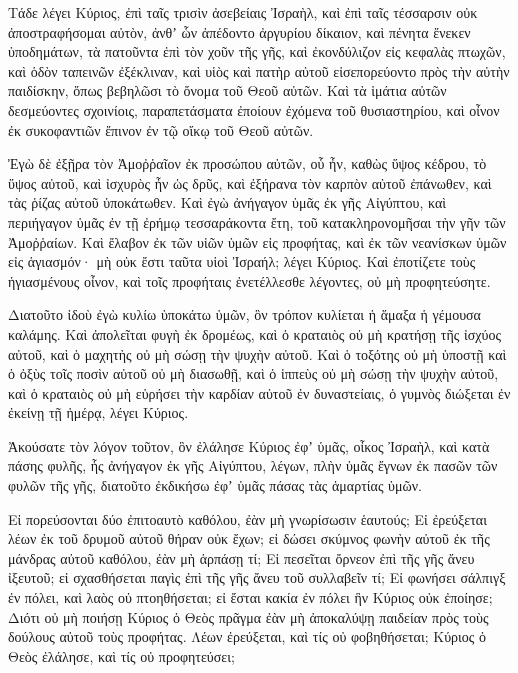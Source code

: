 \begin{spacing}{1.1}
\begin{multicols}{2}
Τάδε λέγει Κύριος, ἐπὶ ταῖς τρισὶν ἀσεβείαις Ἰσραὴλ, καὶ ἐπὶ ταῖς τέσσαρσιν οὐκ ἀποστραφήσομαι αὐτὸν, ἀνθʼ ὧν ἀπέδοντο ἀργυρίου δίκαιον, καὶ πένητα ἕνεκεν ὑποδημάτων,
τὰ πατοῦντα ἐπὶ τὸν χοῦν τῆς γῆς, καὶ ἐκονδύλιζον εἰς κεφαλὰς πτωχῶν, καὶ ὁδὸν ταπεινῶν ἐξέκλιναν, καὶ υἱὸς καὶ πατὴρ αὐτοῦ εἰσεπορεύοντο πρὸς τὴν αὐτὴν παιδίσκην, ὅπως βεβηλῶσι τὸ ὄνομα τοῦ Θεοῦ αὐτῶν.
Καὶ τὰ ἱμάτια αὐτῶν δεσμεύοντες σχοινίοις, παραπετάσματα ἐποίουν ἐχόμενα τοῦ θυσιαστηρίου, καὶ οἶνον ἐκ συκοφαντιῶν ἔπινον ἐν τῷ οἴκῳ τοῦ Θεοῦ αὐτῶν.

Ἐγὼ δὲ ἐξῇρα τὸν Ἀμοῤῥαῖον ἐκ προσώπου αὐτῶν, οὗ ἦν, καθὼς ὕψος κέδρου, τὸ ὕψος αὐτοῦ, καὶ ἰσχυρὸς ἦν ὡς δρῦς, καὶ ἐξήρανα τὸν καρπὸν αὐτοῦ ἐπάνωθεν, καὶ τὰς ῥίζας αὐτοῦ ὑποκάτωθεν.
Καὶ ἐγὼ ἀνήγαγον ὑμᾶς ἐκ γῆς Αἰγύπτου, καὶ περιήγαγον ὑμᾶς ἐν τῇ ἐρήμῳ τεσσαράκοντα ἔτη, τοῦ κατακληρονομῆσαι τὴν γῆν τῶν Ἀμοῤῥαίων.
Καὶ ἔλαβον ἐκ τῶν υἱῶν ὑμῶν εἰς προφήτας, καὶ ἐκ τῶν νεανίσκων ὑμῶν εἰς ἁγιασμόν· μὴ οὐκ ἔστι ταῦτα υἱοὶ Ἰσραήλ; λέγει Κύριος.
Καὶ ἐποτίζετε τοὺς ἡγιασμένους οἶνον, καὶ τοῖς προφήταις ἐνετέλλεσθε λέγοντες, οὐ μὴ προφητεύσητε.

Διατοῦτο ἰδοὺ ἐγὼ κυλίω ὑποκάτω ὑμῶν, ὃν τρόπον κυλίεται ἡ ἅμαξα ἡ γέμουσα καλάμης.
Καὶ ἀπολεῖται φυγὴ ἐκ δρομέως, καὶ ὁ κραταιὸς οὐ μὴ κρατήσῃ τῆς ἰσχύος αὐτοῦ, καὶ ὁ μαχητὴς οὐ μὴ σώσῃ τὴν ψυχὴν αὐτοῦ.
Καὶ ὁ τοξότης οὐ μὴ ὑποστῇ καὶ ὁ ὀξὺς τοῖς ποσὶν αὐτοῦ οὐ μὴ διασωθῇ, καὶ ὁ ἱππεὺς οὐ μὴ σώσῃ τὴν ψυχὴν αὐτοῦ,
καὶ ὁ κραταιὸς οὐ μὴ εὑρήσει τὴν καρδίαν αὐτοῦ ἐν δυναστείαις, ὁ γυμνὸς διώξεται ἐν ἐκείνῃ τῇ ἡμέρᾳ, λέγει Κύριος.

Ἀκούσατε τὸν λόγον τοῦτον, ὃν ἐλάλησε Κύριος ἐφʼ ὑμᾶς, οἶκος Ἰσραὴλ, καὶ κατὰ πάσης φυλῆς, ἧς ἀνήγαγον ἐκ γῆς Αἰγύπτου, λέγων,
πλὴν ὑμᾶς ἔγνων ἐκ πασῶν τῶν φυλῶν τῆς γῆς, διατοῦτο ἐκδικήσω ἐφʼ ὑμᾶς πάσας τὰς ἁμαρτίας ὑμῶν.

Εἰ πορεύσονται δύο ἐπιτοαυτὸ καθόλου, ἐὰν μὴ γνωρίσωσιν ἑαυτούς;
Εἰ ἐρεύξεται λέων ἐκ τοῦ δρυμοῦ αὐτοῦ θήραν οὐκ ἔχων; εἰ δώσει σκύμνος φωνὴν αὐτοῦ ἐκ τῆς μάνδρας αὐτοῦ καθόλου, ἐὰν μὴ ἁρπάσῃ τί;
Εἰ πεσεῖται ὄρνεον ἐπὶ τῆς γῆς ἄνευ ἰξευτοῦ; εἰ σχασθήσεται παγὶς ἐπὶ τῆς γῆς ἄνευ τοῦ συλλαβεῖν τί;
Εἰ φωνήσει σάλπιγξ ἐν πόλει, καὶ λαὸς οὐ πτοηθήσεται; εἰ ἔσται κακία ἐν πόλει ἣν Κύριος οὐκ ἐποίησε;
Διότι οὐ μὴ ποιήσῃ Κύριος ὁ Θεὸς πρᾶγμα ἐὰν μὴ ἀποκαλύψῃ παιδείαν πρὸς τοὺς δούλους αὐτοῦ τοὺς προφήτας.
Λέων ἐρεύξεται, καὶ τίς οὐ φοβηθήσεται; Κύριος ὁ Θεὸς ἐλάλησε, καὶ τίς οὐ προφητεύσει;


\end{multicols}
\end{spacing}
